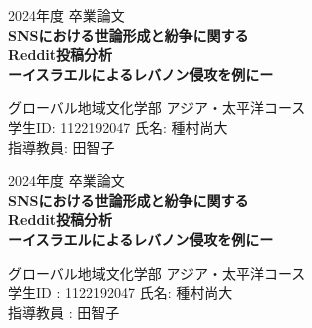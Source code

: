 \documentclass[11pt, a4j]{jreport}
\begin{document}
    \thispagestyle{empty}

    \begin{center}
        \vspace*{20mm}
        {\LARGE\noindent 2024年度 卒業論文}\\
        \vspace{5mm}
        {\huge\noindent\textbf{SNSにおける世論形成と紛争に関する\\
        Reddit投稿分析}}\\
        \medskip
        {\huge\noindent\textbf{ーイスラエルによるレバノン侵攻を例にー}}
    \end{center}
    
    \vfill
    
    \begin{center}
        {\Large\noindent グローバル地域文化学部 アジア・太平洋コース}\\
        \vspace{\baselineskip}
        {\Large\noindent 学生ID: 1122192047 氏名: 種村尚大}\\
        \vspace{\baselineskip}
        {\Large\noindent 指導教員: 田智子}
    \end{center}

    \thispagestyle{empty}
    \clearpage


    \begin{center}
        {\Large 2024年度 卒業論文} \\[5mm]
        {\Large \textbf{SNSにおける世論形成と紛争に関する\\
        Reddit投稿分析\\
        ーイスラエルによるレバノン侵攻を例にー}} \\[15mm]
    \end{center}
    
    \begin{center}
        グローバル地域文化学部 アジア・太平洋コース \\
        学生ID : 1122192047 氏名: 種村尚大 \\
        指導教員 : 田智子 \\[15mm]
    \end{center}
    
\end{document}
